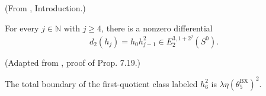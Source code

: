 \begin{theorem}
\label{frontier:Literature:75582be1124c}
(From \cite{LWX126}, Introduction.)\par{}

For every $j\in\mathbb N$ with $j\ge4$, there is a nonzero differential\[d_2(h_j)=h_0h_{j-1}^2\in E_2^{3,1+2^j}(S^0).\]
\end{theorem}

\begin{theorem}
\label{frontier:Literature:86d633a93ab1}
(Adapted from \cite{BurklundXu}, proof of Prop. 7.19.)\par{}

The total boundary of the first-quotient class labeled $h_6^2$ is $\lambda\eta(\theta_5^{\mathrm{BX}})^2$.
\end{theorem}

